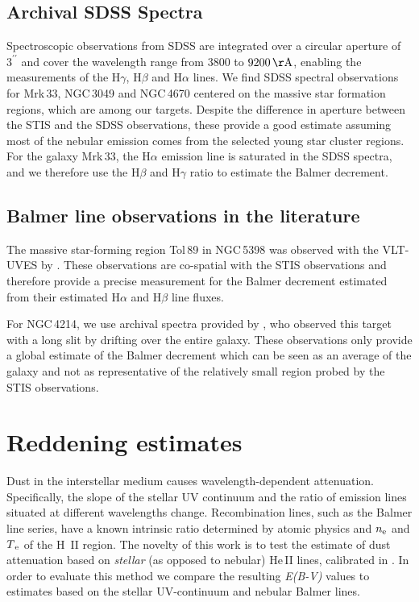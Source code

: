 \documentclass[linenumbers]{aastex63}
\begin{document}
\subsection{Archival SDSS Spectra}\label{sssect:sdss}
Spectroscopic observations from SDSS are integrated over a circular aperture of $3^{\prime\prime}$ and cover the wavelength range from 3800 to $9200\,{\rm \AA}$, enabling the measurements of the H$\gamma$, H$\beta$ and H$\alpha$ lines. 
We find SDSS spectral observations for Mrk\,33, NGC\,3049 and NGC\,4670 centered on the massive star formation regions, which are among our targets. 
Despite the difference in aperture between the STIS and the SDSS observations, these provide a good estimate assuming most of the nebular emission comes from the selected young star cluster regions. For the galaxy Mrk\,33, the H$\alpha$ emission line is saturated in the SDSS spectra, and we therefore use the H$\beta$ and H$\gamma$ ratio to estimate the Balmer decrement.

\subsection{Balmer line observations in the literature}\label{sssect:literature}
The massive star-forming region Tol\,89 in NGC\,5398 was observed with the VLT-UVES by \citet{sidoli_massive_2006}. These observations are co-spatial with the STIS observations and therefore provide a precise measurement for the Balmer decrement estimated from their estimated H$\alpha$ and H$\beta$ line fluxes.

For NGC\,4214, we use archival spectra provided by \citet{moustakas_integrated_2006}, who observed this target with a long slit by drifting over the entire galaxy. These observations only provide a global estimate of the Balmer decrement which can be seen as an average of the galaxy and not as representative of the relatively small region probed by the STIS observations.


\section{Reddening estimates}\label{sect:reddening}
Dust in the interstellar medium causes wavelength-dependent attenuation. Specifically, the slope of the stellar UV continuum and the ratio of emission lines situated at different wavelengths change. Recombination lines, such as the Balmer line series, have a known intrinsic ratio determined by atomic physics and $n{\rm_e}$ and $T{\rm_e}$ of the H~II region.  
The novelty of this work is to test the estimate of dust attenuation based on \textit{stellar} (as opposed to nebular) He\,II lines, calibrated in  \cite{leitherer_he_2019}. In order to evaluate this method we compare the resulting {\it E(B-V)} values to estimates based on the stellar UV-continuum and nebular Balmer lines.
\end{document}
